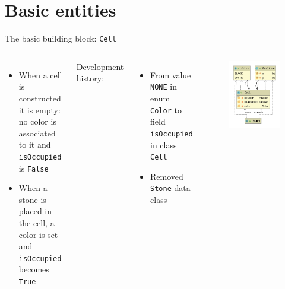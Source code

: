 \documentclass{beamer}
\begin{document}
      
      
      
\section{Basic entities}
\begin{frame}{The basic building block: \texttt{Cell}}

\begin{columns}
\begin{itemize}
\item When a cell is constructed it is empty: no color is associated to it and \texttt{isOccupied} is \texttt{False}
\item When a stone is placed in the cell, a color is set and \texttt{isOccupied} becomes \texttt{True}
\end{itemize}
\vspace{0.8cm}
Development history:
\begin{itemize}
	\item From value \texttt{NONE} in enum \texttt{Color} to field \texttt{isOccupied} in class \texttt{Cell}
	\item Removed \texttt{Stone} data class
\end{itemize}

\begin{figure}
	\includegraphics[scale=0.4]{images/cell-class.png}
\end{figure}

\end{columns}


\end{frame}
\end{document}
